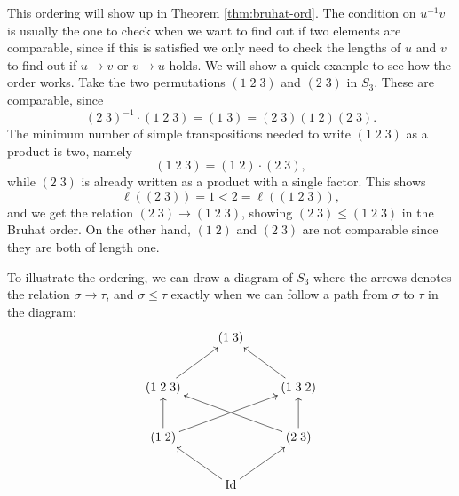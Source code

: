 This ordering will show up in Theorem \ref{thm:bruhat-ord}. The
condition on $u^{-1}v$ is usually the one to check when we want to
find out if two elements are comparable, since if this is satisfied we
only need to check the lengths of $u$ and $v$ to find out if $u \to v$
or $v\to u$ holds. We will
show a quick example to see how the order works. Take the two
permutations $(1\;2\;3)$ and $(2\;3)$ in $S_3$. These are comparable,
since
\[ (2\;3)^{-1} \cdot (1\;2 \;3) = (1\;3) = (2\;3) (1\; 2) (2\; 3). \]
The minimum number of simple transpositions needed to write $(1\;2\;3)$
as a product is two, namely
\[ (1\;2\;3) = (1\;2) \cdot (2\;3), \]
while $(2\;3)$ is already written as a product with a single
factor. This shows
\[ \ell((2\;3)) = 1 < 2 = \ell((1\;2\;3)), \]
and we get the relation $(2\;3) \to (1\;2\;3)$, showing $(2\;3) \leq
(1\;2\;3)$ in the Bruhat order. On the other
hand, $(1\;2)$ and $(2\;3)$ are not comparable since they are both of
length one.

To illustrate the ordering, we can draw a diagram of $S_3$ where the
arrows denotes the relation $\sigma\to\tau$, and $\sigma\leq\tau$
exactly when we can follow a path from $\sigma$ to $\tau$ in the
diagram:
\[ \xymatrix{
  & (1\; 3) & \\
  (1\; 2\; 3)\ar[ur] & & (1\; 3\; 2)\ar[ul] \\
  (1\; 2)\ar[u]\ar[urr] & & (2\; 3) \ar[ull]\ar[u] \\
  & \Id \ar[ul] \ar[ur] &} \]

